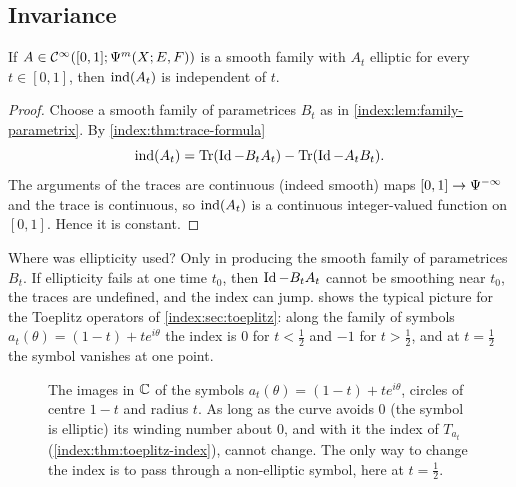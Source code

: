 \subsection{Invariance}
\begin{theorem}\label{index:thm:homotopy}
  If $A\in\mathcal{C}^\infty([0,1];\Psi^{m}(X;E,F))$ is a smooth family with $A_t$ elliptic
  for every $t\in[0,1]$, then $\operatorname{ind}(A_t)$ is independent of $t$.
\end{theorem}
\begin{proof}
  Choose a smooth family of parametrices $B_t$ as in
  \cref{index:lem:family-parametrix}. By \cref{index:thm:trace-formula}
  \begin{equation*}
    \operatorname{ind}(A_t)=\operatorname{Tr}(\operatorname{Id}-B_tA_t)-\operatorname{Tr}(\operatorname{Id}-A_tB_t).
  \end{equation*}
  The arguments of the traces are continuous (indeed smooth) maps
  $[0,1]\to\Psi^{-\infty}$ and the trace is continuous, so $\operatorname{ind}(A_t)$ is a
  continuous integer-valued function on $[0,1]$. Hence it is constant.
\end{proof}

\begin{discussion}
  Where was ellipticity used? Only in producing the smooth family of
  parametrices $B_t$. If ellipticity fails at one time $t_0$, then $\operatorname{Id}-B_tA_t$
  cannot be smoothing near $t_0$, the traces are undefined, and the index can
  jump.  shows the typical picture for the Toeplitz
  operators of \cref{index:sec:toeplitz}: along the family of symbols
  $a_t(\theta)=(1-t)+te^{i\theta}$ the index is $0$ for $t<\frac12$ and $-1$ for
  $t>\frac12$, and at $t=\frac12$ the symbol vanishes at one point.
\end{discussion}

\begin{figure}[ht]
\centering
{}
\caption{The images in $\mathbb{C}$ of the symbols $a_t(\theta)=(1-t)+te^{i\theta}$,
circles of centre $1-t$ and radius $t$. As long as the curve avoids $0$ (the
symbol is elliptic) its winding number about $0$, and with it the index of
$T_{a_t}$ (\cref{index:thm:toeplitz-index}), cannot change. The only way to
change the index is to pass through a non-elliptic symbol, here at
$t=\frac12$.}
\label{index:fig:winding}
\end{figure}

